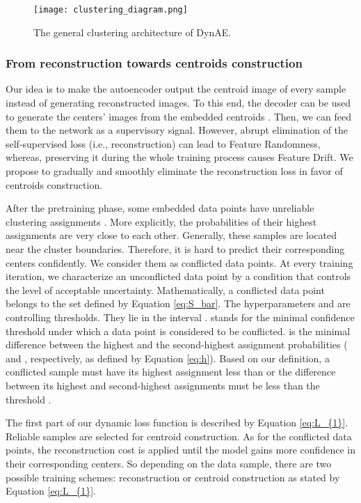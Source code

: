 \documentclass{article}
\begin{document}
\begin{figure}[ht]
\vskip 0.2in
\begin{center}
\centerline{\texttt{[image: clustering\_diagram.png]}}
\caption{The general clustering architecture of DynAE.}
\label{fig:clustering_diagram}
\end{center}
\vskip -0.2in
\end{figure}

\subsubsection{From reconstruction towards centroids construction}

Our idea is to make the autoencoder output the centroid image of every sample instead of generating reconstructed images. To this end, the decoder can be used to generate the centers' images from the embedded centroids . Then, we can feed them to the network as a supervisory signal. However, abrupt elimination of the self-supervised loss (i.e., reconstruction) can lead to Feature Randomness, whereas, preserving it during the whole training process causes Feature Drift. We propose to gradually and smoothly eliminate the reconstruction loss in favor of centroids construction. 

After the pretraining phase, some embedded data points  have unreliable clustering assignments . More explicitly, the probabilities of their highest assignments are very close to each other. Generally, these samples are located near the cluster boundaries. Therefore, it is hard to predict their corresponding centers confidently. We consider them as conflicted data points. At every training iteration, we characterize an unconflicted data point by a condition that controls the level of acceptable uncertainty. Mathematically, a conflicted data point belongs to the set  defined by Equation \ref{eq:S_bar}. The hyperparameters  and  are controlling thresholds. They lie in the interval .  stands for the minimal confidence threshold under which a data point is considered to be conflicted.  is the minimal difference between the highest and the second-highest assignment probabilities ( and , respectively, as defined by Equation \ref{eq:h}). Based on our definition, a conflicted sample must have its highest assignment less than  or the difference between its highest and second-highest assignments must be less than the threshold . 



The first part of our dynamic loss function is described by Equation \ref{eq:L_{1}}. Reliable samples are selected for centroid construction. As for the conflicted data points, the reconstruction cost is applied until the model gains more confidence in their corresponding centers. So depending on the data sample, there are two possible training schemes: reconstruction or centroid construction as stated by Equation \ref{eq:L_{1}}.
\end{document}
